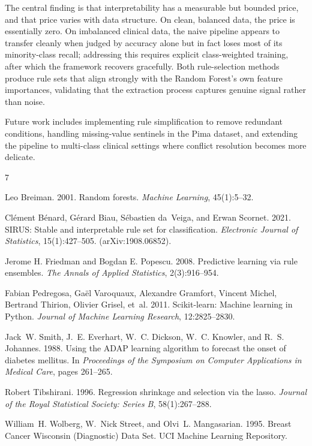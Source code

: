 \documentclass[11pt]{article}
\begin{document}
The central finding is that interpretability has a measurable but bounded price, and that price varies with data structure. On clean, balanced data, the price is essentially zero. On imbalanced clinical data, the naive pipeline appears to transfer cleanly when judged by accuracy alone but in fact loses most of its minority-class recall; addressing this requires explicit class-weighted training, after which the framework recovers gracefully. Both rule-selection methods produce rule sets that align strongly with the Random Forest's own feature importances, validating that the extraction process captures genuine signal rather than noise.

Future work includes implementing rule simplification to remove redundant conditions, handling missing-value sentinels in the Pima dataset, and extending the pipeline to multi-class clinical settings where conflict resolution becomes more delicate.

\begin{thebibliography}{7}

Leo Breiman. 2001.
\newblock Random forests.
\newblock \textit{Machine Learning}, 45(1):5--32.

Cl\'ement B\'enard, G\'erard Biau, S\'ebastien da~Veiga, and Erwan Scornet. 2021.
\newblock SIRUS: Stable and interpretable rule set for classification.
\newblock \textit{Electronic Journal of Statistics}, 15(1):427--505. (arXiv:1908.06852).

Jerome H. Friedman and Bogdan E. Popescu. 2008.
\newblock Predictive learning via rule ensembles.
\newblock \textit{The Annals of Applied Statistics}, 2(3):916--954.

Fabian Pedregosa, Ga\"el Varoquaux, Alexandre Gramfort, Vincent Michel, Bertrand Thirion, Olivier Grisel, et~al. 2011.
\newblock Scikit-learn: Machine learning in Python.
\newblock \textit{Journal of Machine Learning Research}, 12:2825--2830.

Jack~W. Smith, J.~E. Everhart, W.~C. Dickson, W.~C. Knowler, and R.~S. Johannes. 1988.
\newblock Using the ADAP learning algorithm to forecast the onset of diabetes mellitus.
\newblock In \textit{Proceedings of the Symposium on Computer Applications in Medical Care}, pages 261--265.

Robert Tibshirani. 1996.
\newblock Regression shrinkage and selection via the lasso.
\newblock \textit{Journal of the Royal Statistical Society: Series B}, 58(1):267--288.

William~H. Wolberg, W.~Nick Street, and Olvi~L. Mangasarian. 1995.
\newblock Breast Cancer Wisconsin (Diagnostic) Data Set.
\newblock UCI Machine Learning Repository.

\end{thebibliography}
\end{document}
